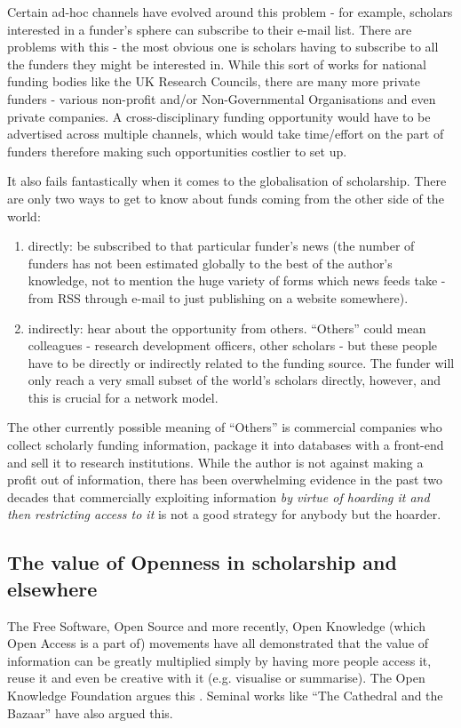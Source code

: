 Certain ad-hoc channels have evolved around this problem - for example, scholars interested in a funder's sphere can subscribe to their e-mail list. There are problems with this - the most obvious one is scholars having to subscribe to all the funders they might be interested in. While this sort of works for national funding bodies like the UK Research Councils, there are many more private funders - various non-profit and/or Non-Governmental Organisations and even private companies. A cross-disciplinary funding opportunity would have to be advertised across multiple channels, which would take time/effort on the part of funders therefore making such opportunities costlier to set up.

It also fails fantastically when it comes to the globalisation of scholarship. There are only two ways to get to know about funds coming from the other side of the world:
\begin{enumerate}
	\item directly: be subscribed to that particular funder's news (the number of funders has not been estimated globally to the best of the author's knowledge, not to mention the huge variety of forms which news feeds take - from RSS through e-mail to just publishing on a website somewhere).
	\item indirectly: hear about the opportunity from others. ``Others'' could mean colleagues - research development officers, other scholars - but these people have to be directly or indirectly related to the funding source. The funder will only reach a very small subset of the world's scholars directly, however, and this is crucial for a network model.
\end{enumerate}

The other currently possible meaning of ``Others'' is commercial companies who collect scholarly funding information, package it into databases with a front-end and sell it to research institutions. While the author is not against making a profit out of information, there has been overwhelming evidence in the past two decades that commercially exploiting information \emph{by virtue of hoarding it and then restricting access to it} is not a good strategy for anybody but the hoarder.

\subsection{The value of Openness in scholarship and elsewhere}
The Free Software, Open Source and more recently, Open Knowledge (which Open Access is a part of) movements have all demonstrated that the value of information can be greatly multiplied simply by having more people access it, reuse it and even be creative with it (e.g. visualise or summarise). The Open Knowledge Foundation argues this \cite{okfn-vision}. Seminal works like ``The Cathedral and the Bazaar'' \cite{catb} have also argued this.

